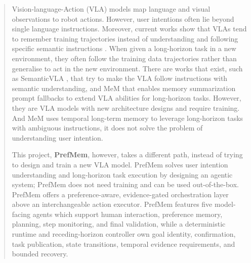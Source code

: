 \documentclass{article}
\begin{document}

\maketitle

\begin{abstract}
Vision-language-Action (VLA) models map language and visual observations to robot actions. However, user intentions often lie beyond single language instructions. Moreover, current works show that VLAs tend to remember training trajectories instead of understanding and following specific semantic instructions \cite{ni2026semanticvla}. When given a long-horizon task in a new environment, they often follow the training data trajectories rather than generalise to act in the new environment. There are works that exist, such as SemanticVLA \cite{ni2026semanticvla}, that try to make the VLA follow instructions with semantic understanding, and MeM \cite{torne2026mem} that enables memory summarization prompt fallbacks to extend VLA abilities for long-horizon tasks. However, they are VLA models with new architecture designs and require training. And MeM \cite{torne2026mem} uses temporal long-term memory to leverage long-horizon tasks with ambiguous instructions, it does not solve the problem of understanding user intention. 

This project, \textbf{PrefMem}, however, takes a different path, instead of trying to design and train a new VLA model. PrefMem solves user intention understanding and long-horizon task execution by designing an agentic system; PrefMem does not need training and can be used out-of-the-box. PrefMem offers a preference-aware, evidence-gated orchestration layer above an interchangeable action executor. PrefMem features five model-facing agents which support human interaction, preference memory, planning, step monitoring, and final validation, while a deterministic runtime and receding-horizon controller own goal identity, confirmation, task publication, state transitions, temporal evidence requirements, and bounded recovery.


\end{abstract}
\end{document}
